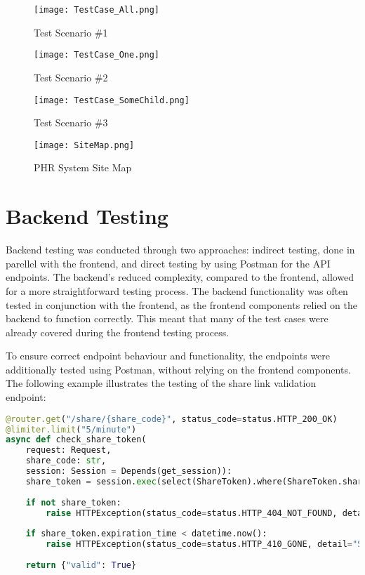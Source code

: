 \begin{figure}[htbp]
    \centering
    \texttt{[image: TestCase\_All.png]}
    \caption{Test Scenario \#1}\label{fig:test1}
\end{figure}

\begin{figure}[htbp]
    \centering
    \texttt{[image: TestCase\_One.png]}
    \caption{Test Scenario \#2}\label{fig:test2}
\end{figure}

\begin{figure}[htbp]
    \centering
    \texttt{[image: TestCase\_SomeChild.png]}
    \caption{Test Scenario \#3}\label{fig:test3}
\end{figure}

\begin{figure}[htbp]
    \centering
    \texttt{[image: SiteMap.png]}
    \caption{PHR System Site Map}\label{fig:sitemap}
\end{figure}

\FloatBarrier{}

\section{Backend Testing}

Backend testing was conducted through two approaches: indirect testing, done in parellel with the frontend, and direct testing by using Postman for the API endpoints. The backend's reduced complexity, compared to the frontend, allowed for a more straightforward testing process. The backend functionality was often tested in conjunction with the frontend, as the frontend components relied on the backend to function correctly. This meant that many of the test cases were already covered during the frontend testing process.

To ensure correct endpoint behaviour and functionality, the endpoints were additionally tested using Postman, without relying on the frontend components. The following example illustrates the testing of the share link validation endpoint:

\begin{lstlisting}[language=Python, caption=Example endpoint for checking a share link for expiration time]
    @router.get("/share/{share_code}", status_code=status.HTTP_200_OK)
@limiter.limit("5/minute")
async def check_share_token(
    request: Request,
    share_code: str,
    session: Session = Depends(get_session)):
    share_token = session.exec(select(ShareToken).where(ShareToken.share_code == share_code)).first()
    
    if not share_token:
        raise HTTPException(status_code=status.HTTP_404_NOT_FOUND, detail="Share token not found")
    
    if share_token.expiration_time < datetime.now():
        raise HTTPException(status_code=status.HTTP_410_GONE, detail="Share token has expired")
    
    return {"valid": True}
\end{lstlisting}

